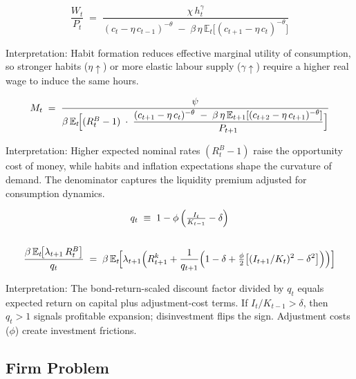 \documentclass[11pt,preprint]{elsarticle}
\numberwithin{equation}{section}
\numberwithin{figure}{section}
\numberwithin{table}{section}
\begin{document}
\begin{equation}\label{labourSupply}
  \frac{W_t}{P_t}
  \;=\;
  \frac{\chi\,h_t^{\gamma}}
       {(c_t - \eta\,c_{t-1})^{-\theta}
        \;-\;
        \beta\,\eta\,\mathbb{E}_t\!\bigl[(c_{t+1} - \eta\,c_t)^{-\theta}\bigr]}
\end{equation}

Interpretation: Habit formation reduces effective marginal utility of
consumption, so stronger habits (\(\eta\uparrow\)) or more elastic
labour supply (\(\gamma\uparrow\)) require a higher real wage to induce
the same hours.

\begin{equation}\label{money_demand}
  M_t
  \;=\;
  \frac{\psi}
       {\beta\,\mathbb{E}_t\!\Bigl[
         (R_t^B - 1)
         \;\cdot\;
         \dfrac{(c_{t+1} - \eta\,c_t)^{-\theta}
               \;-\;
               \beta\,\eta\,\mathbb{E}_{t+1}[(c_{t+2} - \eta\,c_{t+1})^{-\theta}]}
              {P_{t+1}}
       \Bigr]}
\end{equation}

Interpretation: Higher expected nominal rates \((R_t^B - 1)\) raise the
opportunity cost of money, while habits and inflation expectations shape
the curvature of demand. The denominator captures the liquidity premium
adjusted for consumption dynamics.

\begin{equation}\label{capital_euler}
  \begin{gathered}
  q_t \;\equiv\; 1 - \phi\,\Bigl(\tfrac{I_t}{K_{t-1}} - \delta\Bigr) \\
  \\
  \frac{\beta\,\mathbb{E}_t\!\bigl[\lambda_{t+1}\,R_t^B\bigr]}{q_t}
  \;=\;
  \beta\,\mathbb{E}_t\!\Bigl[
    \lambda_{t+1}\Bigl(
      R_{t+1}^k
      + \frac{1}{q_{t+1}}
        \Bigl(
          1 - \delta
          + \tfrac{\phi}{2}\bigl[(I_{t+1}/K_t)^2 - \delta^2\bigr]
        \Bigr)
    \Bigr)
  \Bigr]
  \end{gathered}
\end{equation}

Interpretation: The bond-return-scaled discount factor divided by
\(q_t\) equals expected return on capital plus adjustment-cost terms. If
\(I_t/K_{t-1}>\delta\), then \(q_t>1\) signals profitable expansion;
disinvestment flips the sign. Adjustment costs (\(\phi\)) create
investment frictions.

\subsection{Firm Problem}\label{firm-problem}
\end{document}
